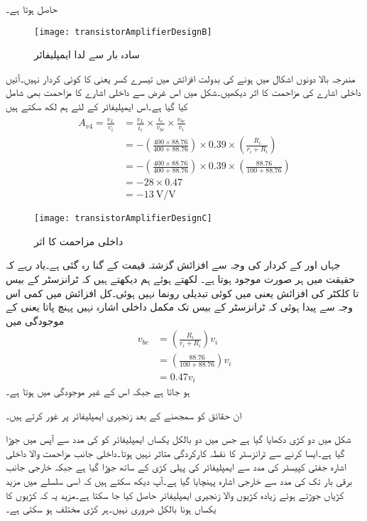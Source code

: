 حاصل ہوتا ہے۔
%
\begin{figure}
\centering
\texttt{[image: transistorAmplifierDesignB]}
\caption{سادہ بار سے لدا ایمپلیفائر}
\label{شکل_سادہ_ایمپلیفائر_بار_کے_اثرات_ب}
\end{figure}
مندرجہ بالا دونوں اشکال میں  ہونے کی بدولت افزائش میں تیسرے کسر یعنی  کا کوئی کردار نہیں۔آئیں داخلی اشارے کی مزاحمت کا اثر دیکھیں۔شکل  میں اس غرض سے داخلی اشارے کا مزاحمت بھی شامل کیا گیا ہے۔اس ایمپلیفائر کے لئے ہم لکھ سکتے ہیں
\begin{align*}
A_{v4}=\frac{v_L}{v_i}&=\frac{v_L}{i_c} \times \frac{i_c}{v_{be}} \times \frac{v_{be}}{v_i}\\
&=-\left(\frac{400 \times 88.76}{400+88.76} \right) \times 0.39 \times \left(\frac{R_i}{r_i+R_i} \right)\\
&=-\left(\frac{400 \times 88.76}{400+88.76} \right) \times 0.39 \times \left(\frac{88.76}{100+88.76} \right)\\
&=-28 \times 0.47\\
&=\SI[per=frac,fraction=nice]{-13}{\volt \per \volt}
\end{align*}
%
\begin{figure}
\centering
\texttt{[image: transistorAmplifierDesignC]}
\caption{داخلی مزاحمت کا اثر}
\label{شکل_سادہ_ایمپلیفائر_داخلی_مزاحمت_کا_اثر}
\end{figure}
جہاں  اور  کے کردار کی وجہ سے افزائش گزشتہ قیمت کے  گنا رہ گئی ہے۔یاد رہے کہ حقیقت میں  ہر صورت موجود ہوتا ہے۔ لکھتے ہوئے ہم دیکھتے ہیں کہ ٹرانزسٹر کے بیس تا کلکٹر  کی افزائش  یعنی  میں کوئی تبدیلی رونما نہیں ہوئی۔کل افزائش  میں کمی اس وجہ سے پیدا ہوئی کہ ٹرانزسٹر کے بیس تک مکمل داخلی اشارہ نہیں پہنچ پاتا یعنی  کے موجودگی میں
\begin{align*}
v_{be}&=\left(\frac{R_i}{r_i+R_i} \right) v_i\\
&=\left(\frac{88.76}{100+88.76} \right)v_i\\
&=0.47 v_i
\end{align*}
ہو جاتا ہے جبکہ اس کے غیر موجودگی میں  ہوتا ہے۔

ان حقائق کو سمجھنے کے بعد زنجیری ایمپلیفائر پر غور کرتے ہیں۔

شکل  میں دو کڑی  دکھایا گیا ہے جس میں دو بالکل یکساں ایمپلیفائر کو   کی مدد سے آپس میں جوڑا گیا ہے۔ایسا کرنے سے ٹرانزسٹر کا نقطہ کارکردگی متاثر نہیں ہوتا۔داخلی جانب  مزاحمت والا داخلی اشارہ  جفتی کپیسٹر  کی مدد سے ایمپلیفائر کی پہلی کڑی کے ساتھ جوڑا گیا ہے جبکہ خارجی جانب برقی بار  تک  کی مدد سے خارجی اشارہ پہنچایا گیا ہے۔آپ دیکھ سکتے ہیں کہ اسی سلسلے میں مزید کڑیاں جوڑتے ہوئے زیادہ کڑیوں والا زنجیری ایمپلیفائر حاصل کیا جا سکتا ہے۔مزید یہ کہ کڑیوں کا یکساں ہونا بالکل ضروری نہیں۔ہر کڑی مختلف ہو سکتی ہے۔

